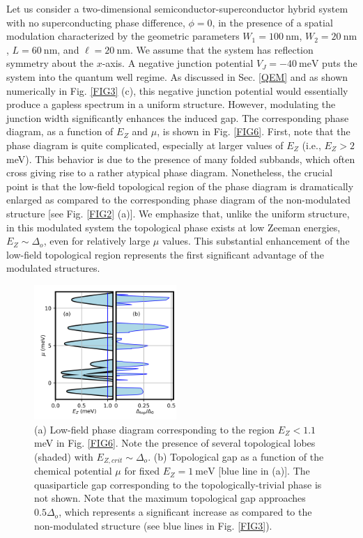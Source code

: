 \documentclass[twocolumn,aps,prb,nofootinbib]{revtex4-2}
\begin{document}
Let us consider a two-dimensional semiconductor-superconductor hybrid system with no superconducting phase difference, $\phi = 0$, in the presence of a spatial  modulation characterized by  the geometric parameters  $W_1 = 100~\text{nm}$, $W_2 = 20~\text{nm}$, $L = 60~\text{nm}$, and $\ell = 20~\text{nm}$. We assume that the system has reflection symmetry about the $x$-axis. 
A negative junction potential $V_J = -40~\text{meV}$ puts the system into the quantum well regime. As discussed in Sec. \ref{QEM} and as shown numerically  in Fig. \ref{FIG3} (c), this negative junction potential would essentially produce  a gapless spectrum in a uniform structure. However, modulating the junction width significantly enhances the induced gap. The corresponding phase diagram, as a function of $E_Z$ and $\mu$, is shown in Fig. \ref{FIG6}. First, note that the phase diagram is quite complicated, especially at larger values of $E_Z$ (i.e., $E_Z > 2~$meV). This behavior is  due to the presence of many  folded subbands, which  often cross giving rise to a rather atypical phase diagram. Nonetheless, the crucial point is that the low-field  topological region of the phase diagram is dramatically enlarged as compared to the corresponding phase diagram of the non-modulated structure  [see Fig. \ref{FIG2} (a)]. We emphasize that, unlike the uniform structure, in this modulated system the topological phase  exists at low Zeeman energies, $E_Z \sim \Delta_o$, even for relatively large $\mu$ values. This substantial enhancement of the low-field topological region represents the first significant advantage of the modulated structures.

\begin{figure}[t]
\begin{center}
\includegraphics[width=0.48\textwidth]{Fig7.png}
\end{center}
\vspace{-3mm}
\caption{(a) Low-field phase diagram corresponding to the region $E_Z < 1.1~$meV in Fig. \ref{FIG6}. Note the presence of several topological lobes (shaded) with $E_{Z,crit} \sim \Delta_o$. (b) Topological gap as a function of the chemical potential $\mu$  for fixed $E_Z = 1~\text{meV}$ [blue line in (a)]. The quasiparticle gap corresponding to the topologically-trivial phase is not shown. Note that the maximum topological gap approaches $0.5 \Delta_o$, which represents a significant increase as compared to the non-modulated structure (see blue lines in Fig. \ref{FIG3}).}
\label{FIG7}
\vspace{-3mm}
\end{figure}
\end{document}
